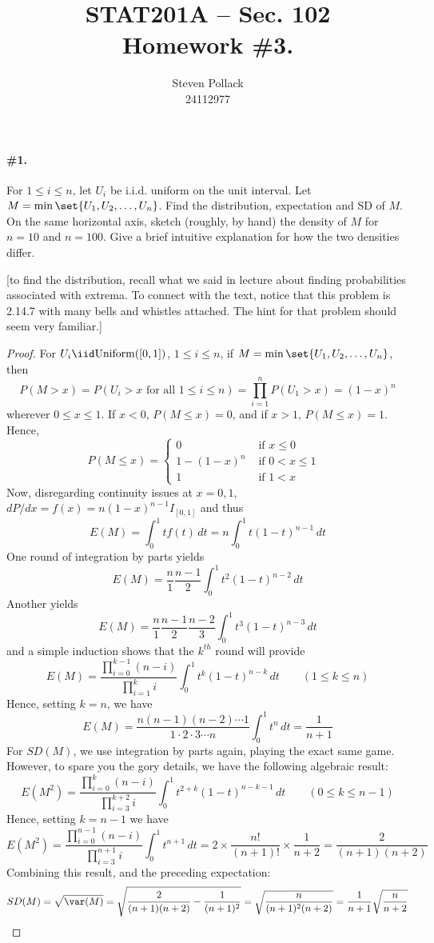 \documentclass[12pt,titlepage]{article}
\title{STAT201A -- Sec. 102 \\ Homework \#3. }
\author{Steven Pollack \\ 24112977}
\date{}
\begin{document}
\maketitle

\pagestyle{empty}
\newpage
\pagestyle{fancy}

\paragraph{\#1.} For $1 \leq i \leq n$, let $U_i$ be i.i.d. uniform on the unit interval. Let $M = \min\set{U_1, U_2, \ldots, U_n}$. Find the distribution, expectation and SD of $M$. On the same horizontal axis, sketch (roughly, by hand) the density of $M$ for $n=10$ and $n=100$. Give a brief intuitive explanation for how the two densities differ. 

[\Hint to find the distribution, recall what we said in lecture about finding probabilities associated with extrema. To connect with the text, notice that this problem is 2.14.7 with many bells and whistles attached. The hint for that problem should seem very familiar.]
\begin{proof}
For $U_i \iid \text{Uniform}([0,1])$, $1 \leq i \leq n$, if $M = \min\set{U_1, U_2, \ldots, U_n}$, then 
\[
P(M > x) = P(\text{$U_i > x$ for all $1 \leq i \leq n$}) = \prod_{i=1}^{n} P(U_1 > x) = (1-x)^{n}
\]
 wherever $0 \leq x \leq 1$. If $x < 0$, $P(M \leq x) = 0$, and if $x >1$, $P(M \leq x) = 1$. Hence,
\[
P(M \leq x) = 
\begin{cases}
0 &\text{ if $x \leq 0$} \\
1-(1-x)^{n} &\text{ if $0 < x \leq 1$ } \\
1 &\text{ if $1 < x$}
\end{cases}
\]
Now, disregarding continuity issues at $x=0,1$, $dP/dx = f(x) = n(1-x)^{n-1} I_{[0,1]}$ and thus 
\[
E(M) = \int_{0}^{1} t f(t) \, dt = n \int_{0}^{1} t(1-t)^{n-1} \, dt
\]
One round of integration by parts yields
\[
E(M) = \frac{n}{1}\frac{n-1}{2} \int_{0}^{1} t^{2} (1-t)^{n-2} \, dt
\]
Another yields
\[
E(M) = \frac{n}{1} \frac{n-1}{2} \frac{n-2}{3} \int_{0}^{1} t^3 (1-t)^{n-3} \, dt
\]
and a simple induction shows that the $k^{th}$ round will provide
\[
E(M) = \frac{\prod_{i=0}^{k-1} (n-i)}{\prod_{i=1}^{k}i} \int_{0}^{1} t^{k} (1-t)^{n-k} \, dt \qquad (1 \leq k \leq n)
\]
Hence, setting $k=n$, we have 
\[
E(M) = \frac{n(n-1)(n-2)\cdots 1}{1 \cdot 2 \cdot 3 \cdots n} \int_{0}^{1} t^{n} \, dt = \frac{1}{n+1}
\]
For $SD(M)$, we use integration by parts again, playing the exact same game. However, to spare you the gory details, we have the following algebraic result:
\[
E(M^2) = \dfrac{\prod_{i=0}^{k}(n-i)}{\prod_{i=3}^{k+2} i}\int_{0}^{1} t^{2+k} (1-t)^{n-k-1} \, dt \qquad (0 \leq k \leq n-1)
\]
Hence, setting $k=n-1$ we have
\[
E(M^2) = \frac{\prod_{i=0}^{n-1} (n-i)}{\prod_{i=3}^{n+1} i} \int_{0}^{1} t^{n+1} \, dt = 2 \times \frac{n!}{(n+1)!} \times \frac{1}{n+2} = \frac{2}{(n+1)(n+2)}
\]
Combining this result, and the preceding expectation:
\[
SD(M) = \sqrt{\var(M)} = \sqrt{\frac{2}{(n+1)(n+2)} - \frac{1}{(n+1)^2}} = \sqrt{ \frac{n}{(n+1)^2(n+2)}} = \frac{1}{n+1}\sqrt{\frac{n}{n+2}}
\]
\end{proof}
\end{document}
